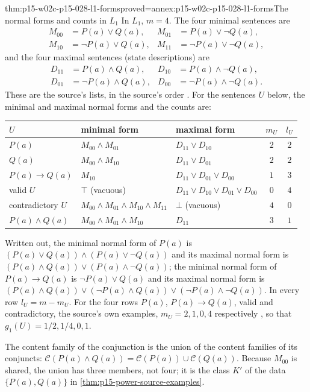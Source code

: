 \begin{hbtheorem}{thm:p15-w02c-p15-028-l1-forms}{proved=annex:p15-w02c-p15-028-l1-forms}{The normal forms and counts in \(L_1\)}
In \(L_1\), \(m=4\). The four minimal sentences are
\[
\begin{aligned}
 M_{00}&=P(a)\lor Q(a), & M_{01}&=P(a)\lor\neg Q(a),\\
 M_{10}&=\neg P(a)\lor Q(a), & M_{11}&=\neg P(a)\lor\neg Q(a),
\end{aligned}
\]
and the four maximal sentences (state descriptions) are
\[
\begin{aligned}
 D_{11}&=P(a)\land Q(a), & D_{10}&=P(a)\land\neg Q(a),\\
 D_{01}&=\neg P(a)\land Q(a), & D_{00}&=\neg P(a)\land\neg Q(a).
\end{aligned}
\]
These are the source's lists, in the source's order
\cite[pp.~166, 168]{HempelOppenheim1948Explanation}.
For the sentences \(U\) below, the minimal and maximal normal forms
and the counts are:
\begin{center}
\small
\begin{tabular}{@{}lllcc@{}}
 \(U\) & minimal form & maximal form & \(m_U\) & \(l_U\)\\
 \hline
 \(P(a)\) & \(M_{00}\land M_{01}\) & \(D_{11}\lor D_{10}\) & \(2\) & \(2\)\\
 \(Q(a)\) & \(M_{00}\land M_{10}\) & \(D_{11}\lor D_{01}\) & \(2\) & \(2\)\\
 \(P(a)\to Q(a)\) & \(M_{10}\) & \(D_{11}\lor D_{01}\lor D_{00}\) & \(1\) & \(3\)\\
 valid \(U\) & \(\top\) (vacuous) & \(D_{11}\lor D_{10}\lor D_{01}\lor D_{00}\) & \(0\) & \(4\)\\
 contradictory \(U\) & \(M_{00}\land M_{01}\land M_{10}\land M_{11}\) & \(\bot\) (vacuous) & \(4\) & \(0\)\\
 \(P(a)\land Q(a)\) & \(M_{00}\land M_{01}\land M_{10}\) & \(D_{11}\) & \(3\) & \(1\)
\end{tabular}
\end{center}
Written out, the minimal normal form of \(P(a)\) is
\((P(a)\lor Q(a))\land(P(a)\lor\neg Q(a))\) and its maximal normal form
is \((P(a)\land Q(a))\lor(P(a)\land\neg Q(a))\); the minimal normal form
of \(P(a)\to Q(a)\) is \(\neg P(a)\lor Q(a)\) and its maximal normal
form is
\((P(a)\land Q(a))\lor(\neg P(a)\land Q(a))\lor(\neg P(a)\land\neg Q(a))\).
In every row \(l_U=m-m_U\). For the four rows \(P(a)\),
\(P(a)\to Q(a)\), valid and contradictory, the source's own examples,
\(m_U=2,1,0,4\) respectively \cite[p.~169]{HempelOppenheim1948Explanation},
so that \(g_1(U)=1/2,1/4,0,1\).

The content family of the conjunction is the union of the content
families of its conjuncts:
\(\mathcal C(P(a)\land Q(a))=\mathcal C(P(a))\cup\mathcal C(Q(a))\).
Because \(M_{00}\) is shared, the union has three members, not four;
it is the class \(K'\) of the data \(\{P(a),Q(a)\}\) in
\cref{thm:p15-power-source-examples}.
\end{hbtheorem}

